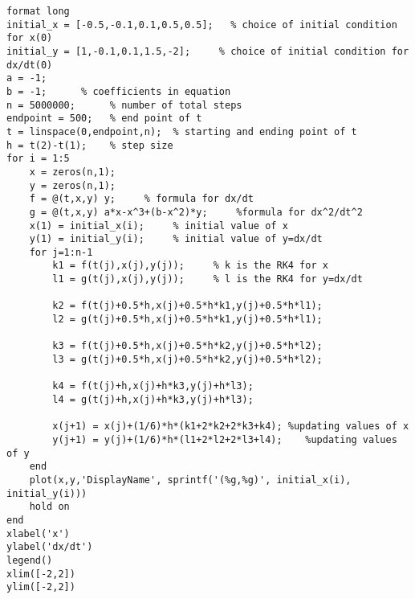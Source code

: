 \lstset{basicstyle=\footnotesize,style=myCustomMatlabStyle}
\begin{lstlisting}
format long
initial_x = [-0.5,-0.1,0.1,0.5,0.5];   % choice of initial condition for x(0)
initial_y = [1,-0.1,0.1,1.5,-2];     % choice of initial condition for dx/dt(0)
a = -1;
b = -1;      % coefficients in equation
n = 5000000;      % number of total steps
endpoint = 500;   % end point of t 
t = linspace(0,endpoint,n);  % starting and ending point of t
h = t(2)-t(1);    % step size
for i = 1:5
    x = zeros(n,1);
    y = zeros(n,1);
    f = @(t,x,y) y;     % formula for dx/dt
    g = @(t,x,y) a*x-x^3+(b-x^2)*y;     %formula for dx^2/dt^2
    x(1) = initial_x(i);     % initial value of x
    y(1) = initial_y(i);     % initial value of y=dx/dt
    for j=1:n-1
        k1 = f(t(j),x(j),y(j));     % k is the RK4 for x
        l1 = g(t(j),x(j),y(j));     % l is the RK4 for y=dx/dt

        k2 = f(t(j)+0.5*h,x(j)+0.5*h*k1,y(j)+0.5*h*l1);
        l2 = g(t(j)+0.5*h,x(j)+0.5*h*k1,y(j)+0.5*h*l1);

        k3 = f(t(j)+0.5*h,x(j)+0.5*h*k2,y(j)+0.5*h*l2);
        l3 = g(t(j)+0.5*h,x(j)+0.5*h*k2,y(j)+0.5*h*l2);

        k4 = f(t(j)+h,x(j)+h*k3,y(j)+h*l3);
        l4 = g(t(j)+h,x(j)+h*k3,y(j)+h*l3);

        x(j+1) = x(j)+(1/6)*h*(k1+2*k2+2*k3+k4); %updating values of x
        y(j+1) = y(j)+(1/6)*h*(l1+2*l2+2*l3+l4);    %updating values of y
    end
    plot(x,y,'DisplayName', sprintf('(%g,%g)', initial_x(i), initial_y(i)))
    hold on
end
xlabel('x')
ylabel('dx/dt')
legend()
xlim([-2,2])
ylim([-2,2])
\end{lstlisting}